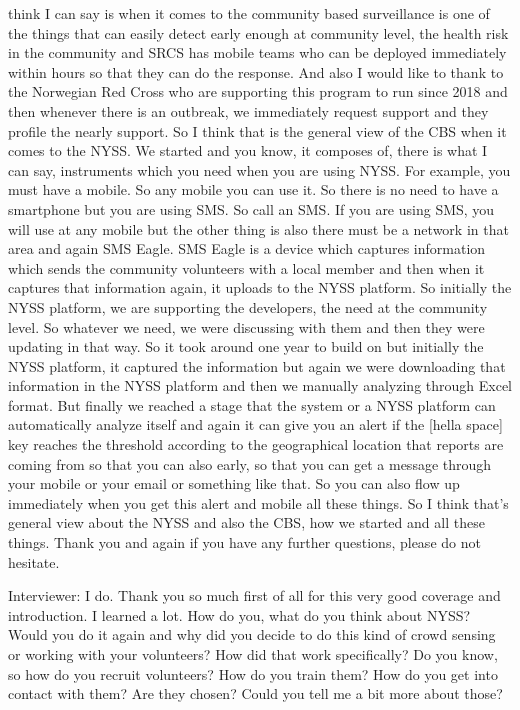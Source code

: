 think I can say is when it comes to the community based surveillance is one of the things that can easily detect early enough at community level, the health risk in the community and SRCS has mobile teams who can be deployed immediately within hours so that they can do the response. And also I would like to thank to the Norwegian Red Cross who are supporting this program to run since 2018 and then whenever there is an outbreak, we immediately request support and they profile the nearly support. So I think that is the general view of the CBS when it comes to the NYSS. We started and you know, it composes of, there is what I can say, instruments which you need when you are using NYSS. For example, you must have a mobile. So any mobile you can use it. So there is no need to have a smartphone but you are using SMS. So call an SMS. If you are using SMS, you will use at any mobile but the other thing is also there must be a network in that area and again SMS Eagle. SMS Eagle is a device which captures information which sends the community volunteers with a local member and then when it captures that information again, it uploads to the NYSS platform. So initially the NYSS platform, we are supporting the developers, the need at the community level. So whatever we need, we were discussing with them and then they were updating in that way. So it took around one year to build on but initially the NYSS platform, it captured the information but again we were downloading that information in the NYSS platform and then we manually analyzing through Excel format. But finally we reached a stage that the system or a NYSS platform can automatically analyze itself and again it can give you an alert if the [hella space] key reaches the threshold according to the geographical location that reports are coming from so that you can also early, so that you can get a message through your mobile or your email or something like that. So you can also flow up immediately when you get this alert and mobile all these things. So I think that's general view about the NYSS and also the CBS, how we started and all these things. Thank you and again if you have any further questions, please do not hesitate.

Interviewer:   I do. Thank you so much first of all for this very good coverage and introduction. I learned a lot. How do you, what do you think about NYSS? Would you do it again and why did you decide to do this kind of crowd sensing or working with your volunteers? How did that work specifically? Do you know, so how do you recruit volunteers? How do you train them? How do you get into contact with them? Are they chosen? Could you tell me a bit more about those? 

